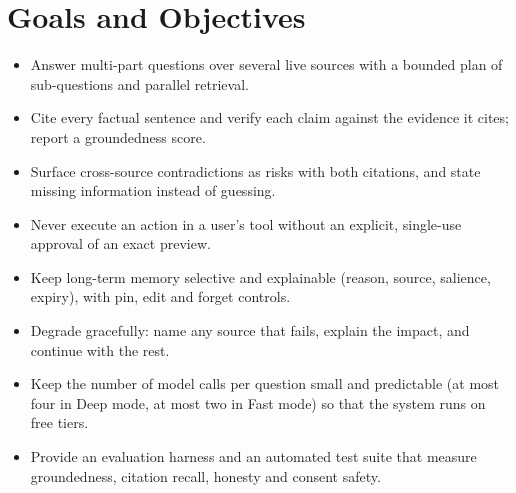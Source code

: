 \documentclass[oneside,a4paper,12pt]{report}
\begin{document}
\section{Goals and Objectives}
\label{sec:goals}
\begin{itemize}
	\item Answer multi-part questions over several live sources with a bounded plan of sub-questions and parallel retrieval.
	\item Cite every factual sentence and verify each claim against the evidence it cites; report a groundedness score.
	\item Surface cross-source contradictions as risks with both citations, and state missing information instead of guessing.
	\item Never execute an action in a user's tool without an explicit, single-use approval of an exact preview.
	\item Keep long-term memory selective and explainable (reason, source, salience, expiry), with pin, edit and forget controls.
	\item Degrade gracefully: name any source that fails, explain the impact, and continue with the rest.
	\item Keep the number of model calls per question small and predictable (at most four in Deep mode, at most two in Fast mode) so that the system runs on free tiers.
	\item Provide an evaluation harness and an automated test suite that measure groundedness, citation recall, honesty and consent safety.
\end{itemize}
\end{document}
